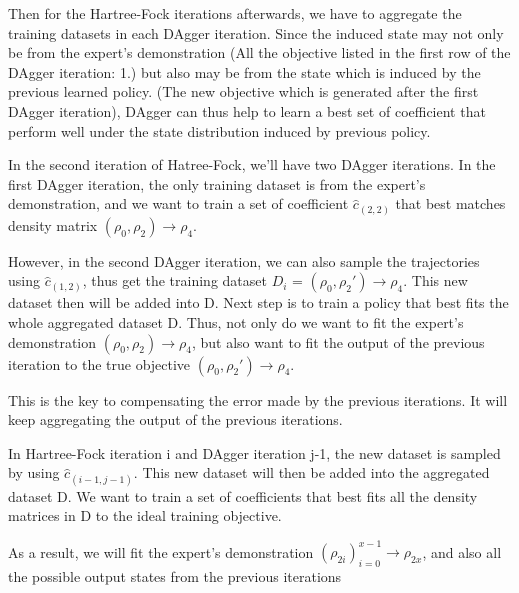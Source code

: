 \documentclass[twoside]{article}
\begin{document}
Then for the Hartree-Fock iterations afterwards, we have to aggregate the training datasets in each DAgger iteration. Since the induced state may not only be from the expert's demonstration (All the objective listed in the first row of the DAgger iteration: 1.) but also
 may be from the state which is induced by the previous learned policy. (The new objective which is generated after the first DAgger iteration), DAgger can thus help to learn a best set of coefficient that perform well under the state distribution induced by previous policy.

In the second iteration of Hatree-Fock, we'll have two DAgger iterations. In the first DAgger iteration, the only training dataset is from the expert's demonstration, and we want to train a set of coefficient  $\hat{c}_{(2,2)}$ that best matches density matrix $(\rho_0,\rho_2) \rightarrow \rho_4$.

However, in the second DAgger iteration, we can also sample the trajectories using $\hat{c}_{(1,2)}$, thus get the training dataset $D_i$ = $(\rho_0, \rho_2') \rightarrow \rho_4$. This new dataset then will be added into D.
Next step is to train a policy that best fits the whole aggregated dataset D. Thus, not only do we want to fit the expert's demonstration $(\rho_0, \rho_2) \rightarrow \rho_4$, but also want to fit the output of the previous iteration to the true objective $ (\rho_0,\rho_{2}') \rightarrow \rho_4$. 


This is the key to compensating the error made by the previous iterations. It will keep aggregating the output of the previous iterations.





In Hartree-Fock iteration i and DAgger iteration j-1, the new dataset
is sampled by using $\hat{c}_{(i-1,j-1)}$. This new dataset will then be added into the aggregated dataset D. We want to train a set of coefficients that best fits all the density matrices in D to the ideal training objective.


As a result, we will fit the expert's demonstration $(\rho_{2i})_{i=0}^{x-1} \rightarrow \rho_{2x}$, and also all the possible output states from the previous iterations 
\end{document}
